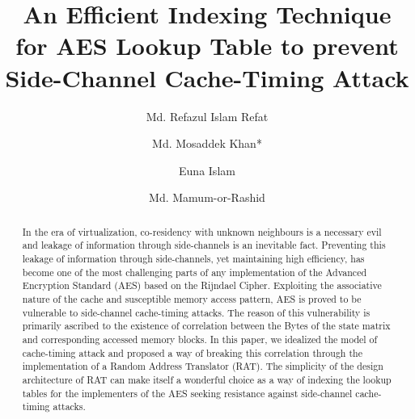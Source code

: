 \documentclass[3p]{elsarticle}
\begin{document}
\begin{frontmatter}

\title{An Efficient Indexing Technique for AES Lookup Table to prevent Side-Channel Cache-Timing Attack}






\author[label1]{Md. Refazul Islam Refat}
\author[label1]{Md. Mosaddek Khan*}
\author[label1]{Euna Islam}
\author[label1]{Md. Mamum-or-Rashid}


\address[label1]{Department of Computer Science and Engineering, University of Dhaka, Bangladesh}


\begin{abstract}
In the era of virtualization, co-residency with unknown neighbours is a necessary evil and leakage of information through side-channels is an inevitable fact. Preventing this leakage of information through side-channels, yet maintaining high efficiency, has become one of the most challenging parts of any implementation of the Advanced Encryption Standard (AES) based on the Rijndael Cipher. Exploiting the associative nature of the cache and susceptible memory access pattern, AES is proved to be vulnerable to side-channel cache-timing attacks. The reason of this vulnerability is primarily ascribed to the existence of correlation between the Bytes of the state matrix and corresponding accessed memory blocks. In this paper, we idealized the model of cache-timing attack and proposed a way of breaking this correlation through the implementation of a Random Address Translator (RAT). The simplicity of the design architecture of RAT can make itself a wonderful choice as a way of indexing the lookup tables for the implementers of the AES seeking resistance against side-channel cache-timing attacks.
\end{abstract}


\end{frontmatter}
\end{document}
